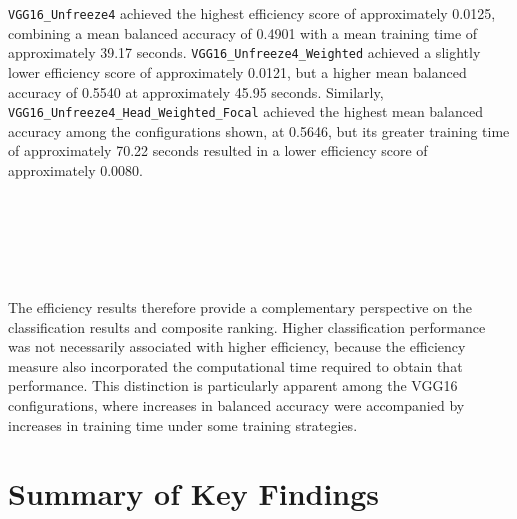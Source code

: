 \documentclass[12pt, a4paper]{report}
\let\oldsection\section
\renewcommand{\section}{%
    \Needspace{6\baselineskip}%
    \oldsection
}
\begin{document}
				\texttt{VGG16\_Unfreeze4} achieved the highest efficiency score of approximately 0.0125, combining a mean balanced accuracy of 0.4901 with a mean training time of approximately 39.17 seconds. \texttt{VGG16\_Unfreeze4\_Weighted} achieved a slightly lower efficiency score of approximately 0.0121, but a higher mean balanced accuracy of 0.5540 at approximately 45.95 seconds. Similarly, \\\texttt{VGG16\_Unfreeze4\_Head\_Weighted\_Focal} achieved the highest mean balanced accuracy among the configurations shown, at 0.5646, but its greater training time of approximately 70.22 seconds resulted in a lower efficiency score of approximately 0.0080.\\\\\\\\\\\\\\
				The efficiency results therefore provide a complementary perspective on the classification results and composite ranking. Higher classification performance was not necessarily associated with higher efficiency, because the efficiency measure also incorporated the computational time required to obtain that performance. This distinction is particularly apparent among the VGG16 configurations, where increases in balanced accuracy were accompanied by increases in training time under some training strategies.
				
		\section{Summary of Key Findings}
			
\end{document}
